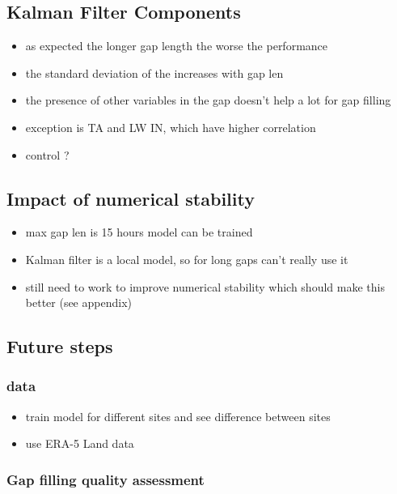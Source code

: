 \documentclass{article}
\let\Oldsubsection\subsection
\renewcommand{\subsection}{\FloatBarrier\Oldsubsection}
\begin{document}
\subsection{Kalman Filter Components}

\begin{itemize}
    \item as expected the longer gap length the worse the performance
    \item the standard deviation of the increases with gap len
\end{itemize}

\begin{itemize}
    \item the presence of other variables in the gap doesn't help a lot for gap filling
    \item exception is TA and LW IN, which have higher correlation
    \item control ?
\end{itemize}


\subsection{Impact of numerical stability}

\begin{itemize}
    \item max gap len is 15 hours model can be trained
    \item Kalman filter is a local model, so for long gaps can't really use it
    \item still need to work to improve numerical stability which should make this better (see appendix)
\end{itemize}


\subsection{Future steps}

\subsubsection{data}
\begin{itemize}
    \item train model for different sites and see difference between sites
    \item use ERA-5 Land data
\end{itemize}

\subsubsection{Gap filling quality assessment}
\end{document}
